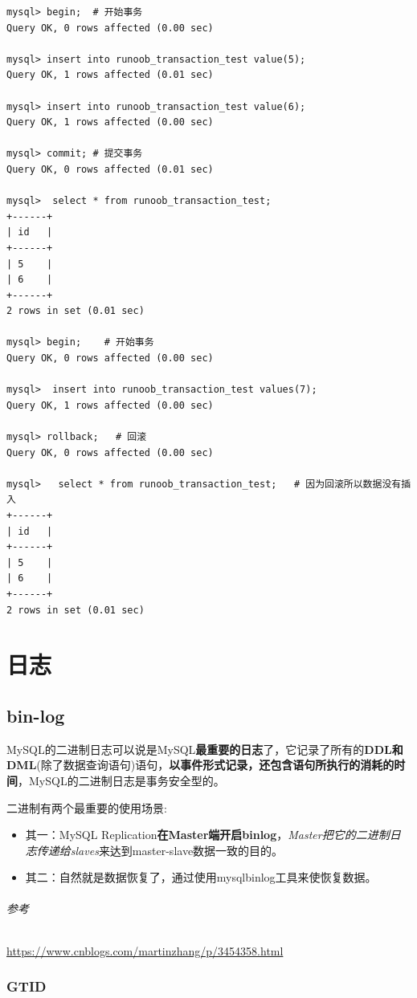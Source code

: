 \documentclass[UTF8,a4paper,12pt]{ctexbook}
\begin{document}
		\begin{lstlisting}
mysql> begin;  # 开始事务
Query OK, 0 rows affected (0.00 sec)
 
mysql> insert into runoob_transaction_test value(5);
Query OK, 1 rows affected (0.01 sec)
 
mysql> insert into runoob_transaction_test value(6);
Query OK, 1 rows affected (0.00 sec)
 
mysql> commit; # 提交事务
Query OK, 0 rows affected (0.01 sec)

mysql>  select * from runoob_transaction_test;
+------+
| id   |
+------+
| 5    |
| 6    |
+------+
2 rows in set (0.01 sec)
 
mysql> begin;    # 开始事务
Query OK, 0 rows affected (0.00 sec)
 
mysql>  insert into runoob_transaction_test values(7);
Query OK, 1 rows affected (0.00 sec)
 
mysql> rollback;   # 回滚
Query OK, 0 rows affected (0.00 sec)
 
mysql>   select * from runoob_transaction_test;   # 因为回滚所以数据没有插入
+------+
| id   |
+------+
| 5    |
| 6    |
+------+
2 rows in set (0.01 sec)		
		\end{lstlisting}


\chapter{日志}
	\section{bin-log}
		MySQL的二进制日志可以说是MySQL\textbf{最重要的日志}了，它记录了所有的\textbf{DDL和DML}(除了数据查询语句)语句，\textbf{以事件形式记录，还包含语句所执行的消耗的时间}，MySQL的二进制日志是事务安全型的。
		
		二进制有两个最重要的使用场景: 
			\begin{itemize}
				\item 其一：MySQL Replication\textbf{在Master端开启binlog}，\textit{Master把它的二进制日志传递给slaves}来达到master-slave数据一致的目的。 
				\item 其二：自然就是数据恢复了，通过使用mysqlbinlog工具来使恢复数据。
			\end{itemize}    
		    
		\subparagraph{参考}
			\url{https://www.cnblogs.com/martinzhang/p/3454358.html}
	
		\subsection{GTID}	
	
\end{document}
